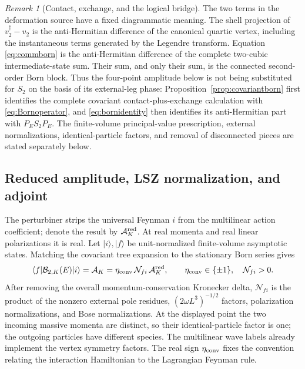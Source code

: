\documentclass[11pt]{article}
\theoremstyle{definition}
\theoremstyle{remark}
\newtheorem{remark}[theorem]{Remark}
\newcommand{\dg}{\dagger}
\newcommand{\AK}{\mathcal A_K}
\newcommand{\AKred}{\mathcal A_K^{\rm red}}
\newcommand{\Born}{\mathcal B}
\begin{document}
\begin{remark}[Contact, exchange, and the logical bridge]
The two terms in the deformation source have a fixed diagrammatic
meaning.  The shell projection of $v_2^{\dg}-v_2$ is the
anti-Hermitian difference of the canonical quartic vertex, including
the instantaneous terms generated by the Legendre transform.  Equation
\eqref{eq:commborn} is the anti-Hermitian difference of the complete
two-cubic intermediate-state sum.  Their sum, and only their sum, is the
connected second-order Born block.  Thus the four-point amplitude below
is not being substituted for $S_2$ on the basis of its external-leg
phase: Proposition~\ref{prop:covariantborn} first identifies the complete
covariant contact-plus-exchange calculation with \eqref{eq:Bornoperator},
and \eqref{eq:bornidentity} then identifies its anti-Hermitian part with
$P_ES_2P_E$.  The finite-volume principal-value prescription, external
normalizations, identical-particle factors, and removal of disconnected
pieces are stated separately below.
\end{remark}

\subsection{Reduced amplitude, LSZ normalization, and adjoint}

The perturbiner strips the universal Feynman $i$ from the multilinear
action coefficient; denote the result by $\AKred$.  At real momenta and
real linear polarizations it is real.  Let $|i\rangle,|f\rangle$ be
unit-normalized finite-volume asymptotic states.  Matching the covariant
tree expansion to the stationary Born series gives
\begin{equation}\label{eq:LSZmap}
\langle f|\Born_{2,K}(E)|i\rangle
=\AK=\eta_{\rm conv}\,\mathcal N_{fi}\,\AKred,
\qquad \eta_{\rm conv}\in\{\pm1\},\quad \mathcal N_{fi}>0.
\end{equation}
After removing the overall momentum-conservation Kronecker delta,
$\mathcal N_{fi}$ is the product of the nonzero external pole
residues, $(2\omega L^3)^{-1/2}$ factors, polarization normalizations,
and Bose normalizations.  At the displayed point the two incoming
massive momenta are distinct, so their identical-particle factor is one;
the outgoing particles have different species.  The multilinear wave
labels already implement the vertex symmetry factors.  The real sign
$\eta_{\rm conv}$ fixes the convention relating the interaction
Hamiltonian to the Lagrangian Feynman rule.
\end{document}
